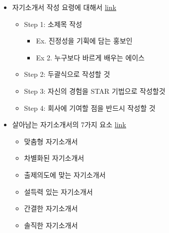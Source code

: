 \documentclass[12pt]{article}
\begin{document}
\begin{itemize}
\begin{itemize}
    \end{itemize}
    \item 자기소개서 작성 요령에 대해서 \href{https://brunch.co.kr/@hklim/11}{link}
    \begin{itemize}
        \item Step 1: 소제목 작성
        \begin{itemize}
            \item Ex. 진정성을 기휙에 담는 홍보인
            \item Ex 2. 누구보다 바르게 배우는 에이스
        \end{itemize}
        \item Step 2: 두괄식으로 작성할 것
        \item Step 3: 자신의 경험을 STAR 기법으로 작성할것
        \item Step 4: 회사에 기여할 점을 반드시 작성할 것
    \end{itemize}

    \bigskip
    \item 살아남는 자기소개서의 7가지 요소 \href{https://brunch.co.kr/@kuehyunpark/6}{link}
    \begin{itemize}
        \item 맞춤형 자기소개서
        \item 차별화된 자기소개서
        \item 출제의도에 맞는 자기소개서
        \item 설득력 있는 자기소개서
        \item 간결한 자기소개서
        \item 솔직한 자기소개서
    \end{itemize}

\end{itemize}
\end{document}

